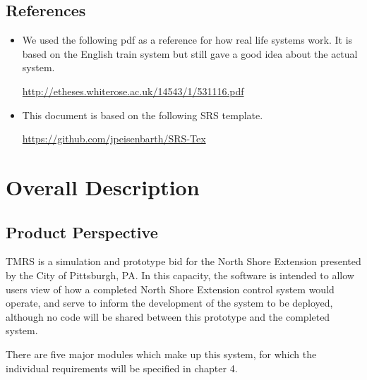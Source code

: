 \documentclass{scrreprt}
\begin{document}
\section{References}
\begin{itemize}
\item We used the following pdf as a reference for how real life systems work. It is based on the 
English train system but still gave a good idea about the actual system.

\url{http://etheses.whiterose.ac.uk/14543/1/531116.pdf} 

\item This document is based on  the following SRS template.

\url{https://github.com/jpeisenbarth/SRS-Tex}
\end{itemize}
\chapter{Overall Description}

\section{Product Perspective}
TMRS is a simulation and prototype bid for the North Shore Extension presented by the City of Pittsburgh, PA.
In this capacity, the software is intended to allow users view of how a completed North Shore Extension control system would operate, and serve to inform the development of the system to be deployed, although no code will be shared between this prototype and the completed system.

There are five major modules which make up this system, for which the individual requirements will be specified in chapter 4.
\end{document}
